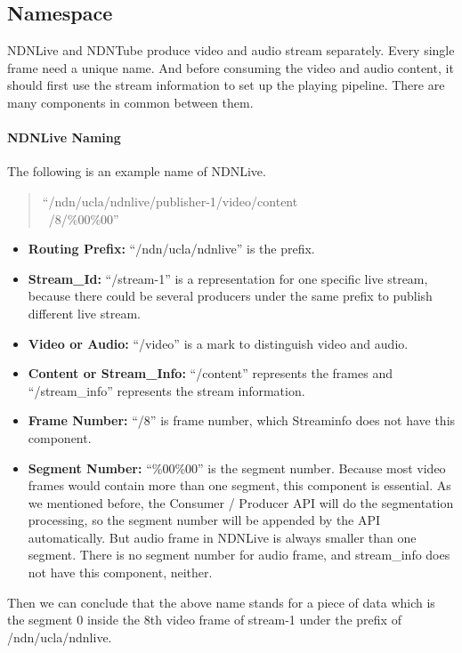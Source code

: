 \subsection{Namespace}

NDNLive and NDNTube produce video and audio stream separately. Every single frame need a unique name. And before consuming the video and audio content, it should first use the stream information to set up the playing pipeline. There are many components in common between them. 

\paragraph{NDNLive Naming} %
\label{par:ndnlive_naming}

The following is an example name of NDNLive. 

\begin{quote}
``/ndn/ucla/ndnlive/publisher-1/video/content \\\ /8/\%00\%00''
\end{quote}
\begin{itemize}
	\item{\textbf{Routing Prefix:}} ``/ndn/ucla/ndnlive'' is the prefix.
	\item{\textbf{Stream\_Id:}} ``/stream-1'' is a representation for one specific live stream, because there could be several producers under the same prefix to publish different live stream.
	\item{\textbf{Video or Audio:}} ``/video'' is a mark to distinguish video and audio.
	\item{\textbf{Content or Stream\_Info:}} ``/content'' represents the frames and ``/stream\_info'' represents the stream information.
	\item{\textbf{Frame Number:}} ``/8'' is frame number, which Streaminfo does not have this component.
	\item{\textbf{Segment Number:}} ``\%00\%00'' is the segment number. Because most video frames would contain more than one segment, this component is essential. As we mentioned before, the Consumer / Producer API will do the segmentation processing, so the segment number will be appended by the API automatically. But audio frame in NDNLive is always smaller than one segment. There is no segment number for audio frame, and stream\_info does not have this component, neither.
\end{itemize}

Then we can conclude that the above name stands for a piece of data which is the segment 0 inside the 8th video frame of stream-1 under the prefix of /ndn/ucla/ndnlive. 

